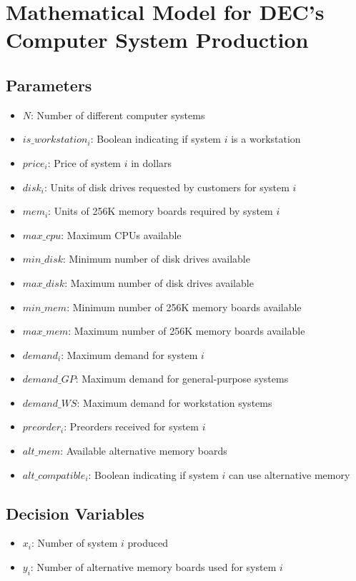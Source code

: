 \documentclass{article}
\begin{document}
\section*{Mathematical Model for DEC's Computer System Production}

\subsection*{Parameters}
\begin{itemize}
    \item $N$: Number of different computer systems
    \item $is\_workstation_i$: Boolean indicating if system $i$ is a workstation
    \item $price_i$: Price of system $i$ in dollars
    \item $disk_i$: Units of disk drives requested by customers for system $i$
    \item $mem_i$: Units of 256K memory boards required by system $i$
    \item $max\_cpu$: Maximum CPUs available
    \item $min\_disk$: Minimum number of disk drives available
    \item $max\_disk$: Maximum number of disk drives available
    \item $min\_mem$: Minimum number of 256K memory boards available
    \item $max\_mem$: Maximum number of 256K memory boards available
    \item $demand_i$: Maximum demand for system $i$
    \item $demand\_GP$: Maximum demand for general-purpose systems
    \item $demand\_WS$: Maximum demand for workstation systems
    \item $preorder_i$: Preorders received for system $i$
    \item $alt\_mem$: Available alternative memory boards
    \item $alt\_compatible_i$: Boolean indicating if system $i$ can use alternative memory
\end{itemize}

\subsection*{Decision Variables}
\begin{itemize}
    \item $x_i$: Number of system $i$ produced
    \item $y_i$: Number of alternative memory boards used for system $i$
\end{itemize}
\end{document}
